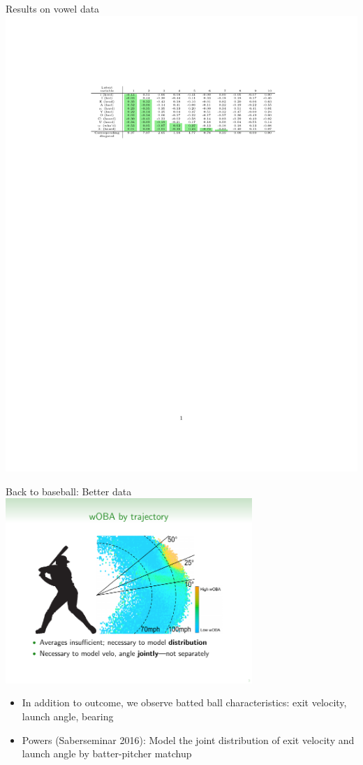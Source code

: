 \documentclass[handout]{beamer}
\begin{document}
\begin{frame}{Results on vowel data}
\centering
\includegraphics[width = \textwidth]{figures/B_vowel_fancy.pdf}\\
\end{frame}

\begin{frame}{Back to baseball: Better data}
  \centering
  \includegraphics[width = 0.7\textwidth]{figures/xwoba.pdf}
  \begin{itemize}
    \item In addition to outcome, we observe batted ball characteristics: exit velocity, launch angle, bearing
    \item Powers (Saberseminar 2016): Model the joint distribution of exit velocity and launch angle by batter-pitcher matchup
  \end{itemize}
\end{frame}
\end{document}
